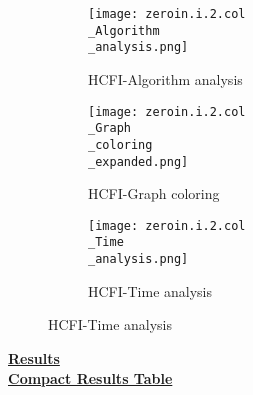\documentclass[10pt]{article}
\begin{document}
\graphicspath{{./Core1/Solutions/HCFI/zeroin.i.2.col}}
\begin{figure}[H]
\begin{subfigure}{.33\textwidth}
  \centering
  \texttt{[image: zeroin.i.2.col\\\_Algorithm\\\_analysis.png]}
  \caption{HCFI-Algorithm analysis}
   \label{fig:subfig1}
\end{subfigure}%
\begin{subfigure}{.33\textwidth}
  \centering
  \texttt{[image: zeroin.i.2.col\\\_Graph\\\_coloring\\\_expanded.png]}
  \caption{HCFI-Graph coloring}
  \label{fig:subfig2}
\end{subfigure}
\begin{subfigure}{.33\textwidth}
  \centering
  \texttt{[image: zeroin.i.2.col\\\_Time\\\_analysis.png]}
  \caption{HCFI-Time analysis}
  \end{subfigure}
\end{figure}
\vspace{2cm}
\begin{center}
\hyperlink{page.8}{\textbf{Results}}\\
\vspace{0.5cm}
\hyperlink{page.71}{\textbf{Compact Results Table}}
\end{center}
\pagebreak%
\end{document}
